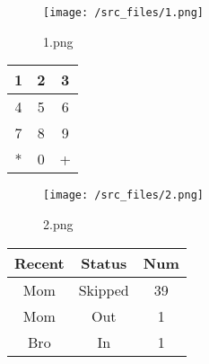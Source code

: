 \documentclass{article}
\author{artem}
\begin{document}
\maketitle
\begin{figure}[H]
\centering
\texttt{[image: /src\_files/1.png]}
\caption{1.png}
\end{figure}
\begin{table}[H]
\centering
\begin{tabular}{|c|c|c|}
\hline
1 & 2 & 3 \\ \hline
4 & 5 & 6 \\ \hline
7 & 8 & 9 \\ \hline
* & 0 & + \\ \hline
\end{tabular}
\end{table}
\begin{figure}[H]
\centering
\texttt{[image: /src\_files/2.png]}
\caption{2.png}
\end{figure}
\begin{table}[H]
\centering
\begin{tabular}{|c|c|c|}
\hline
Recent & Status & Num \\ \hline
Mom & Skipped & 39 \\ \hline
Mom & Out & 1 \\ \hline
Bro & In & 1 \\ \hline
\end{tabular}
\end{table}
\end{document}
